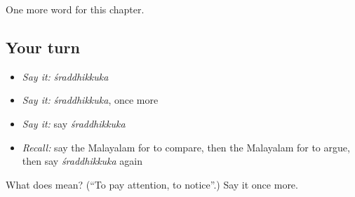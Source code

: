 \begin{grammarlens}[title={What you've built}]
One more word for this chapter.
\end{grammarlens}

\subsection*{Your turn}
\begin{itemize}
\raggedright
  \item \emph{Say it:} \emph{śraddhikkuka}
  \item \emph{Say it:} \emph{śraddhikkuka}, once more
  \item \emph{Say it:} say \emph{śraddhikkuka}
  \item \emph{Recall:} say the Malayalam for to compare, then the Malayalam for to argue, then say \emph{śraddhikkuka} again
\end{itemize}

\begin{tcolorbox}[breakable,colback=teal!4,colframe=teal!35!black,title={Before you move on}]
What does  mean? (\textquotedblleft{}To pay attention, to notice\textquotedblright{}.) Say it once more.
\end{tcolorbox}
